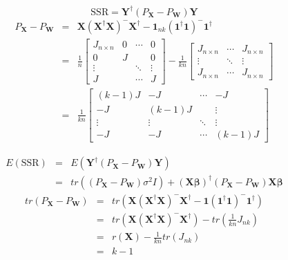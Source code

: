 \documentclass{article}
\begin{document}
\bigskip

\begin{equation*}
\text{SSR}=\mathbf{Y}^{\dagger }\left( P_{\mathbf{X}}-P_{\mathbf{W}}\right) 
\mathbf{Y}
\end{equation*}%
\begin{eqnarray*}
P_{\mathbf{X}}-P_{\mathbf{W}} &=&\mathbf{X}\left( \mathbf{X}^{\dagger }%
\mathbf{X}\right) ^{-}\mathbf{X}^{\dagger }-\mathbf{1}_{nk}\left( \mathbf{1}%
^{\dagger }\mathbf{1}\right) ^{-}\mathbf{1}^{\dagger } \\
&=&\frac{1}{n}\left[ 
\begin{array}{cccc}
J_{n\times n} & 0 & \cdots & 0 \\ 
0 & J &  & 0 \\ 
\vdots &  & \ddots & \vdots \\ 
J &  & \cdots & J%
\end{array}%
\right] -\frac{1}{kn}\left[ 
\begin{array}{ccc}
J_{n\times n} & \cdots & J_{n\times n} \\ 
\vdots & \ddots & \vdots \\ 
J_{n\times n} & \cdots & J_{n\times n}%
\end{array}%
\right] \\
&=&\frac{1}{kn}\left[ 
\begin{array}{cccc}
\left( k-1\right) J & -J & \cdots & -J \\ 
-J & \left( k-1\right) J &  & \vdots \\ 
\vdots & \vdots & \ddots & \vdots \\ 
-J & -J & \cdots & \left( k-1\right) J%
\end{array}%
\right]
\end{eqnarray*}

\begin{eqnarray*}
E\left( \text{SSR}\right) &=&E\left( \mathbf{Y}^{\dagger }\left( P_{\mathbf{X%
}}-P_{\mathbf{W}}\right) \mathbf{Y}\right) \\
&=&tr\left( \left( P_{\mathbf{X}}-P_{\mathbf{W}}\right) \sigma ^{2}I\right)
+\left( \mathbf{X\beta }\right) ^{\dagger }\left( P_{\mathbf{X}}-P_{\mathbf{W%
}}\right) \mathbf{X\beta }
\end{eqnarray*}%
\begin{eqnarray*}
tr\left( P_{\mathbf{X}}-P_{\mathbf{W}}\right) &=&tr\left( \mathbf{X}\left( 
\mathbf{X}^{\dagger }\mathbf{X}\right) ^{-}\mathbf{X}^{\dagger }-\mathbf{1}%
\left( \mathbf{1}^{\dagger }\mathbf{1}\right) ^{-}\mathbf{1}^{\dagger
}\right) \\
&=&tr\left( \mathbf{X}\left( \mathbf{X}^{\dagger }\mathbf{X}\right) ^{-}%
\mathbf{X}^{\dagger }\right) -tr\left( \frac{1}{kn}J_{nk}\right) \\
&=&r\left( \mathbf{X}\right) -\frac{1}{kn}tr\left( J_{nk}\right) \\
&=&k-1
\end{eqnarray*}
\end{document}
